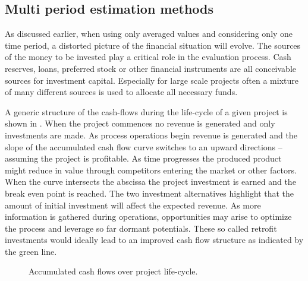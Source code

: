     \subsection{Multi period estimation methods}
    \label{sec:MultiPeriod}
        As discussed earlier, when using only averaged values and considering only one time period,
        a distorted picture of the financial situation will evolve. The sources of the money to be invested
        play a critical role in the evaluation process. Cash reserves, loans, preferred stock or other financial
        instruments are all conceivable sources for investment capital. Especially for large scale projects often a
        mixture of many different sources is used to allocate all necessary funds.

        A generic structure of the
        cash-flows during the life-cycle of a given project is shown in . When the project
        commences no revenue is generated and only investments are made. As process operations begin revenue
        is generated and  the slope of the accumulated cash flow curve switches to an upward directions
        -- assuming the project is profitable. As time progresses the produced product might reduce in value
        through competitors entering the market or other factors. When the curve intersects the abscissa the
        project investment is earned and the break even point is reached. The two investment alternatives highlight
        that the amount of initial investment will affect the expected revenue. As more information is gathered
        during operations, opportunities may arise to optimize the process and leverage so far dormant potentials.
        These so called retrofit investments would ideally lead to an improved cash flow structure as indicated
        by the green line.

        \begin{figure}
            \center
            
            \caption{Accumulated cash flows over project life-cycle.\cite{Marquardt.2008}}
            \label{fig:CashFlow}
        \end{figure}

